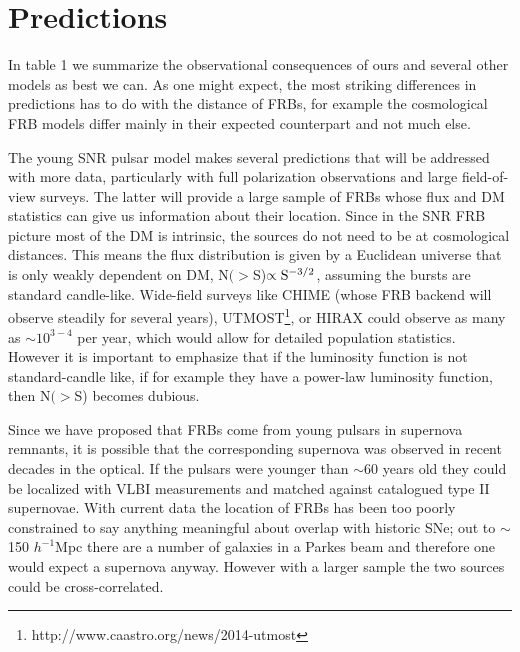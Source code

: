 \documentclass[useAMS,usenatbib]{mn2e}
\begin{document}
\section{Predictions}
\label{sec-predictions}

In table 1 we summarize the observational consequences
of ours and several other models as best we can. As one might expect,
the most striking differences in predictions has to do with the distance of FRBs,
for example the cosmological FRB models differ mainly in their expected
counterpart and not much else. 

The young SNR pulsar model makes several predictions that will
be addressed with more data, particularly with full polarization 
observations and large field-of-view surveys. 
The latter will provide a large sample of FRBs whose flux and DM statistics
 can give us information about their location. Since in the SNR FRB picture
most of the DM is intrinsic, the sources do not need to be at cosmological 
distances. This means the flux distribution is given by a Euclidean universe
that is only weakly dependent on DM, N$(>$S)$ \propto \rm S^{-3/2}$, assuming
the bursts are standard candle-like.
Wide-field surveys
like CHIME \citep{2014SPIE.9145E..22B} (whose FRB backend will 
observe steadily for several years), 
UTMOST\footnote{http://www.caastro.org/news/2014-utmost},
 or HIRAX could observe as many as $\sim10^{3-4}$
per year, which would allow for detailed population statistics. However 
it is important to emphasize that if the luminosity function is not 
standard-candle like, if for example they have a power-law luminosity function,
then N$(>$S) becomes dubious.

Since we have proposed that FRBs come from young pulsars 
in supernova remnants, it is possible that the corresponding 
supernova was observed in recent decades in the optical. If the pulsars
were younger than $\sim$60 years old they could be localized with VLBI
measurements and matched against catalogued type II supernovae. With
current data the location of FRBs has been too poorly constrained to say anything 
meaningful about overlap with historic SNe; out to $\sim$150 $h^{-1}$Mpc 
there are a number of galaxies in a Parkes beam and therefore one would 
expect a supernova anyway. However with a larger sample the two sources 
could be cross-correlated. 

\end{document}
